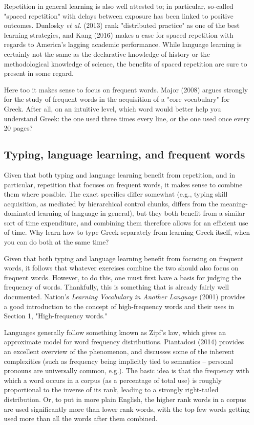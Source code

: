 \documentclass[11pt]{article}
\begin{document}
Repetition in general learning is also well attested to; in particular, so-called "spaced repetition" with delays between exposure has been linked to positive outcomes. Dunlosky \emph{et al.} (2013) rank "distributed practice" as one of the best learning strategies, and Kang (2016) makes a case for spaced repetition with regards to America's lagging academic performance. While language learning is certainly not the same as the declarative knowledge of history or the methodological knowledge of science, the benefits of spaced repetition are sure to present in some regard.

Here too it makes sense to focus on frequent words. Major (2008) argues strongly for the study of frequent words in the acquisition of a "core vocabulary" for Greek. After all, on an intuitive level, which word would better help you understand Greek: the one used three times every line, or the one used once every 20 pages?

\subsection{Typing, language learning, and frequent words}
\label{sec:org9505ae2}

Given that both typing and language learning benefit from repetition, and in particular, repetition that focuses on frequent words, it makes sense to combine them where possible. The exact specifics differ somewhat (e.g., typing skill acquisition, as mediated by hierarchical control chunks, differs from the meaning-dominated learning of language in general), but they both benefit from a similar sort of time expenditure, and combining them therefore allows for an efficient use of time. Why learn how to type Greek separately from learning Greek itself, when you can do both at the same time?

Given that both typing and language learning benefit from focusing on frequent words, it follows that whatever exercises combine the two should also focus on frequent words. However, to do this, one must first have a basis for judging the frequency of words. Thankfully, this is something that is already fairly well documented. Nation's \emph{Learning Vocabulary in Another Language} (2001) provides a good introduction to the concept of high-frequency words and their uses in Section 1, "High-frequency words." 

Languages generally follow something known as Zipf's law, which gives an approximate model for word frequency distributions. Piantadosi (2014) provides an excellent overview of the phenomenon, and discusses some of the inherent complexities (such as frequency being implicitly tied to semantics -- personal pronouns are universally common, e.g.). The basic idea is that the frequency with which a word occurs in a corpus (as a percentage of total use) is roughly proportional to the inverse of its rank, leading to a strongly right-tailed distribution. Or, to put in more plain English, the higher rank words in a corpus are used significantly more than lower rank words, with the top few words getting used more than all the words after them combined.
\end{document}
